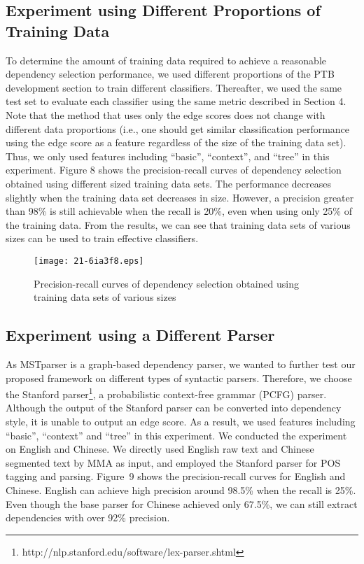 \documentclass[english]{jnlp_1.4}
\begin{document}
\subsection{Experiment using Different Proportions of Training Data}

To determine the amount of training data required to achieve a reasonable dependency selection performance,
we used different proportions of the PTB development section to train different classifiers.
Thereafter, we used the same test set to evaluate each classifier using the same metric described in Section 4.
Note that the method that uses only the edge scores does not change with different data proportions
(i.e., one should get similar classification performance using the edge score as a feature regardless of the size of the training data set).
Thus, we only used features including ``basic'', ``context'', and ``tree'' in this experiment.
Figure 8 shows the precision-recall curves of dependency selection obtained using different sized training data sets.
The performance decreases slightly when the training data set decreases in size. 
However, a precision greater than 98\% is still achievable when the recall is 20\%, even when using only 25\% of the training data. 
From the results, we can see that training data sets of various sizes can be used to train effective classifiers.

\begin{figure}[b]
\begin{center}
\texttt{[image: 21-6ia3f8.eps]}
\end{center}
 \caption{Precision-recall curves of dependency selection obtained using training data sets of various sizes}
\end{figure}


\subsection{Experiment using a Different Parser}

As MSTparser is a graph-based dependency parser, we wanted to further test our proposed framework on different types of syntactic parsers.
Therefore, we choose the Stanford parser\footnote{http://nlp.stanford.edu/software/lex-parser.shtml}, a probabilistic context-free grammar (PCFG) parser.
Although the output of the Stanford parser can be converted into dependency style,
it is unable to output an edge score.
As a result, we used features including ``basic'', ``context'' and ``tree'' in this experiment.
We conducted the experiment on English and Chinese. 
We directly used English raw text and Chinese segmented text by MMA as input, and employed the Stanford parser for POS tagging and parsing.
Figure~9 shows the precision-recall curves for English and Chinese.
English can achieve high precision around 98.5\% when the recall is 25\%.
Even though the base parser for Chinese achieved only 67.5\%, we can still extract dependencies with over 92\% precision.
\end{document}
